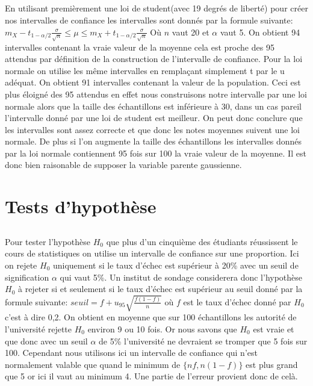 \documentclass[a4paper, 11pt]{article}
\begin{document}
\subsection{}
En utilisant premièrement une loi de student(avec 19 degrés de liberté) pour créer nos intervalles de confiance les intervalles sont donnés par la formule suivante: $m_X - t_{1-\alpha/2}\frac{\sigma}{\sqrt{n}} \leq \mu \leq m_X + t_{1-\alpha/2}\frac{\sigma}{\sqrt{n}}$ Où $n$ vaut 20 et $\alpha$ vaut 5. On obtient 94 intervalles contenant la vraie valeur de la moyenne cela  est proche des 95 attendus par définition de la construction de l'intervalle de confiance. Pour la loi normale on utilise les même intervalles en remplaçant simplement t par le u adéquat. On obtient 91 intervalles contenant la valeur de la population. Ceci est plus éloigné des 95 attendus en effet nous construisons notre intervalle par une loi normale alors que la taille des échantillons est inférieure à 30, dans un cas pareil l'intervalle donné par une loi de student est meilleur. On peut donc conclure que les intervalles sont assez correcte et que donc les notes moyennes suivent une loi normale. De plus si l'on augmente la taille des échantillons les intervalles donnés par la loi normale contiennent 95 fois sur 100 la vraie valeur de la moyenne. Il est donc bien raisonable de supposer la variable parente gaussienne.
\section{Tests d'hypothèse}
\subsection{}
Pour tester l'hypothèse $H_0$ que plus d'un cinquième des étudiants réussissent le cours de statistiques on utilise un intervalle de confiance sur une proportion. Ici on rejete $H_0$ uniquement si le taux d'échec est supérieur à 20\% avec un seuil de signification $\alpha$ qui vaut 5\%. Un institut de sondage considerera donc l'hypothèse $H_0$ à rejeter si et seulement si le taux d'échec est supérieur au seuil donné par la formule suivante: $seuil = f + u_{95}\sqrt{\frac{f(1-f)}{n}}$ où $f$ est le taux d'échec donné par $H_0$ c'est à dire 0,2. On obtient en moyenne que sur 100 échantillons les autorité de l'université rejette $H_0$ environ 9 ou 10 fois. Or nous savons que $H_0$ est vraie et que donc avec un seuil $\alpha$ de 5\% l'université ne devraient se tromper que 5 fois sur 100. Cependant nous utilisons ici un intervalle de confiance qui n'est normalement valable que quand le minimum de $\{nf, n(1-f)\}$ est plus grand que 5 or ici il vaut au minimum 4. Une partie de l'erreur provient donc de celà.
\end{document}
